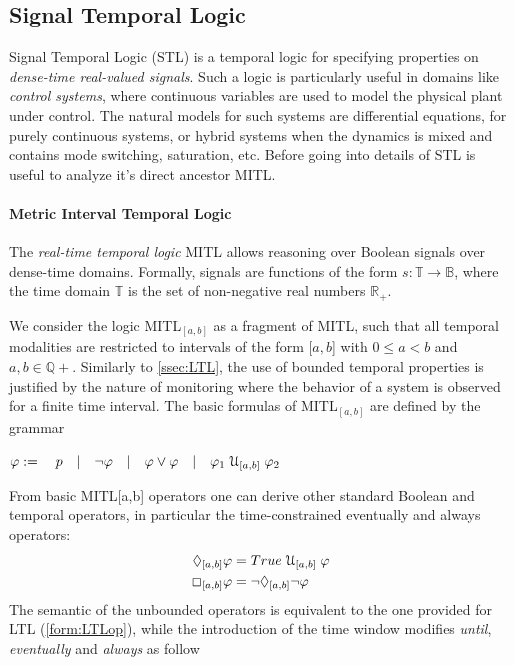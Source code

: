 \subsection{Signal Temporal Logic}
\label{sec:STL}

Signal Temporal Logic (STL) \citep{maler2004monitoring} is a temporal logic for specifying properties on \textit{dense-time real-valued signals}. Such a logic is particularly useful in domains like \textit{control systems}, where continuous variables are used to model the physical plant	under control. The natural models for such systems are differential equations, for purely continuous systems, or hybrid systems when the dynamics is mixed and contains mode switching, saturation, etc. Before going into details of STL is useful to analyze it's direct ancestor MITL.

\paragraph{Metric Interval Temporal Logic} The \textit{real-time temporal logic} MITL \citep{alur1996benefits} allows reasoning over Boolean signals over dense-time domains. Formally, signals are functions of the form $s: \mathbb{T} \rightarrow \mathbb{B}$, where the time domain $\mathbb{T}$ is the set of non-negative real numbers $\mathbb{R}_+$.
\par We consider the logic MITL$_{[a,b]}$ as a fragment of MITL, such that all temporal modalities are restricted to intervals of the form [$a, b$] with $0 \leq a < b$ and $a, b \in \mathbb{Q}+$. Similarly to \ref{ssec:LTL}, the use of bounded temporal properties is justified by the nature of monitoring where the behavior of a system is observed for a finite time interval. The basic formulas of MITL$_{[a,b]}$ are defined by the grammar
\begin{center}
$\varphi := \quad p \quad | \quad \neg \varphi \quad | \quad \varphi \vee \varphi \quad | \quad \varphi_1 \; \EuScript{U}_{[a,b]} \; \varphi_2 $
\end{center}
From basic MITL[a,b] operators one can derive other standard Boolean and temporal operators, in particular the time-constrained eventually and always operators:
\begin{align*}
\lozenge_{[a,b]} \varphi &= True \; \EuScript{U}_{[a,b]} \; \varphi \\
\Box_{[a,b]} \varphi &= \neg \lozenge_{[a,b]} \neg \varphi 
\end{align*}
The semantic of the unbounded operators is equivalent to the one provided for LTL (\ref{form:LTLop}), while the introduction of the time window modifies \textit{until}, \textit{eventually} and \textit{always} as follow
